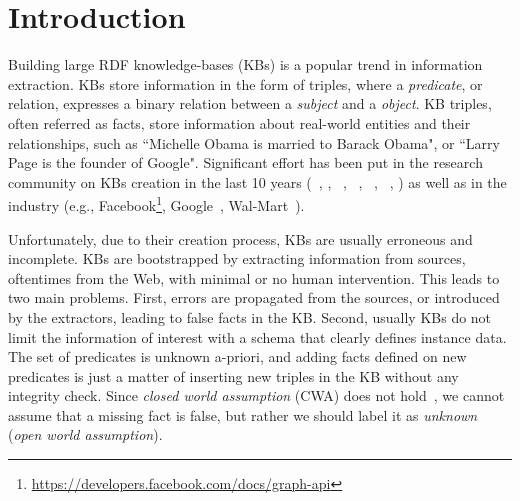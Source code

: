 \section{Introduction}

Building large RDF knowledge-bases (KBs) is a popular trend in information extraction.
KBs store information in the form of triples, where a \emph{predicate}, or relation, expresses a binary relation between a \emph{subject} and a \emph{object}. KB triples, often referred as facts, store information about real-world entities and their relationships, such as %
 ``Michelle Obama is married to Barack Obama", or ``Larry Page is the founder of Google".
Significant effort has been put in the research community on KBs creation in the last 10 years (~\cite{bizer2009dbpedia}, \cite{bollacker2008freebase}, ~\cite{vrandevcic2014wikidata}, \deepdive~\cite{shin2015incremental}, ~\cite{suchanek2008yago}, ~\cite{carlson2010toward}, \cite{banko2007open}) as well as in the industry %
(e.g., Facebook\footnote{\url{https://developers.facebook.com/docs/graph-api}}, Google~\cite{dong2014knowledge}, Wal-Mart~\cite{deshpande2013building}).

Unfortunately, due to their creation process, KBs are usually erroneous and incomplete.
KBs are bootstrapped by extracting information from sources, oftentimes from the Web, with minimal or no human intervention.  This leads to two main problems. First, errors are propagated from the sources, or introduced by the extractors, leading to false facts in the KB. Second, usually KBs do not limit the information of interest with a schema that clearly defines instance data. The set of predicates is unknown a-priori, and adding facts defined on new predicates is just a matter of inserting new triples in the KB without any integrity check.  
Since \emph{closed world assumption} (CWA) does not hold~\cite{dong2014knowledge,galarraga2015fast}, we cannot assume that a missing fact is false, but rather we should label it as \emph{unknown} (\emph{open world assumption}).



